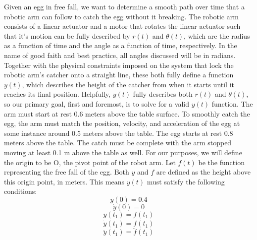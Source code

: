 \documentclass[nofoot,pdf-a,balance,colorlinks,upint,subscriptcorrection,varvw,mathalfa=cal=boondoxo]{asmeconf}
\begin{document}
    Given an egg in free fall, we want to determine a smooth path over time that a robotic arm can follow to catch the egg without it breaking. The robotic arm consists of a linear actuator and a motor that rotates the linear actuator such that it's motion can be fully described by $r\left(t\right)$ and $\theta\left(t\right)$, which are the radius as a function of time and the angle as a function of time, respectively. In the name of good faith and best practice, all angles discussed will be in radians. Together with the physical constraints imposed on the system that lock the robotic arm's catcher onto a straight line, these both fully define a function $y\left(t\right)$, which describes the height of the catcher from when it starts until it reaches its final position. Helpfully, $y\left(t\right)$ fully describes both $r\left(t\right)$ and $\theta\left(t\right)$, so our primary goal, first and foremost, is to solve for a valid $y\left(t\right)$ function. The arm must start at rest 0.6 meters above the table surface. To smoothly catch the egg, the arm must match the position, velocity, and acceleration of the egg at some instance around 0.5 meters above the table. The egg starts at rest 0.8 meters above the table. The catch must be complete with the arm stopped moving at least 0.1 m above the table as well. \newline \newline 
    For our purposes, we will define the origin to be O, the pivot point of the robot arm. Let $f\left(t\right)$ be the function representing the free fall of the egg. Both $y$ and $f$ are defined as the height above this origin point, in meters. This means $y\left(t\right)$ must satisfy the following conditions:
    \begin{equation}\label{condition_1}
        y\left(0\right) = 0.4
    \end{equation}
    \begin{equation}\label{condition_2}
        \dot{y}\left(0\right) = 0
    \end{equation}
    \begin{equation}\label{condition_3}
        {y}\left(t_1\right) = f\left(t_1\right) 
    \end{equation}
    \begin{equation}\label{condition_4}
        \dot{y}\left(t_1\right) = \dot{f}\left(t_1\right)
    \end{equation}
    \begin{equation}\label{condition_5}
        \ddot{y}\left(t_1\right) = \ddot{f}\left(t_1\right)
    \end{equation}
\end{document}
